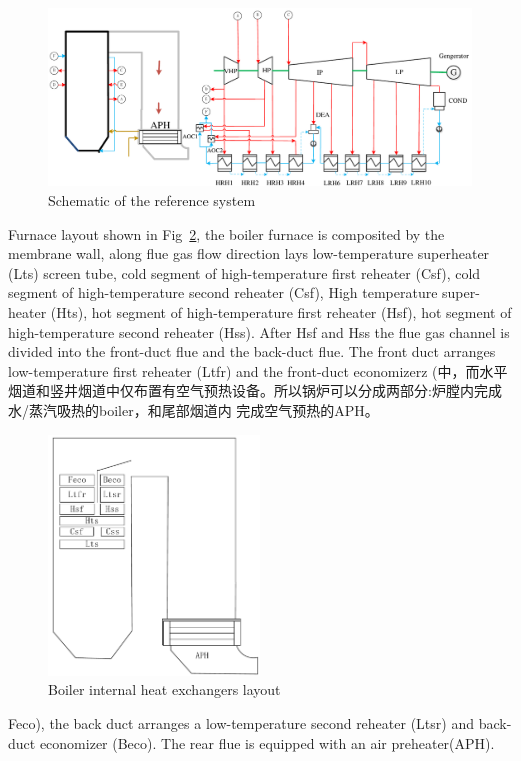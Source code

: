 \documentclass[preprint,12pt]{elsarticle}
\begin{document}
\begin{figure}[htbp]
\centering
\includegraphics[width=1\textwidth]{fig/reference_system}
\caption{Schematic of the reference system} 
\label{fig:reference_system}
\end{figure}
Furnace layout shown in Fig~\ref{fig:boiler_surface}, the boiler furnace is composited by the membrane wall, along flue gas flow direction lays low-temperature superheater (Lts) screen tube, cold segment of high-temperature ﬁrst reheater (Csf), cold segment of high-temperature second reheater (Csf), High temperature super-heater (Hts), hot segment of high-temperature ﬁrst reheater (Hsf), hot segment of high-temperature second reheater (Hss).
After Hsf and Hss the flue gas channel is divided into the front-duct flue and the back-duct flue. The front duct arranges low-temperature first reheater (Ltfr) and the front-duct economizerz (中，而水平烟道和竖井烟道中仅布置有空气预热设备。所以锅炉可以分成两部分:炉膛内完成水/蒸汽吸热的boiler，和尾部烟道内 完成空气预热的APH。
\begin{figure}[htbp]
\centering
\includegraphics[width=0.5\textwidth]{fig/boiler_surface}
\caption{Boiler internal heat exchangers layout} 
\label{fig:boiler_surface}
\end{figure}
Feco), the back duct arranges a low-temperature second reheater (Ltsr) and back-duct economizer (Beco). The rear flue is equipped with an air preheater(APH).
\end{document}
